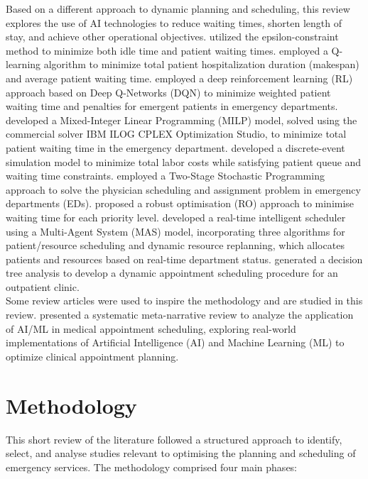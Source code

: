 \documentclass[runningheads]{llncs}
\begin{document}
Based on a different approach to dynamic planning and scheduling, this review explores the use of AI technologies to reduce waiting times, shorten length of stay, and achieve other operational objectives. \cite{fallahpour2024or} utilized the epsilon-constraint method to minimize both idle time and patient waiting times. \cite{bouchlaghem2024surgery} employed a Q-learning algorithm to minimize total patient hospitalization duration (makespan) and average patient waiting time. \cite{lee2020rl} employed a deep reinforcement learning (RL) approach based on Deep Q-Networks (DQN) to minimize weighted patient waiting time and penalties for emergent patients in emergency departments. \cite{harzi2017ed} developed a Mixed-Integer Linear Programming (MILP) model, solved using the commercial solver IBM ILOG CPLEX Optimization Studio, to minimize total patient waiting time in the emergency department. \cite{assad2019ed} developed a discrete-event simulation model to minimize total labor costs while satisfying patient queue and waiting time constraints. \cite{marchesi2020physician} employed a Two-Stage Stochastic Programming approach to solve the physician scheduling and assignment problem in emergency departments (EDs). \cite{mahmoudzadeh2020robust} proposed a robust optimisation (RO) approach to minimise waiting time for each priority level. \cite{munavalli2020mas} developed a real-time intelligent scheduler using a Multi-Agent System (MAS) model, incorporating three algorithms for patient/resource scheduling and dynamic resource replanning, which allocates patients and resources based on real-time department status. \cite{creps2017outpatient} generated a decision tree analysis to develop a dynamic appointment scheduling procedure for an outpatient clinic.\\
Some review articles were used to inspire the methodology and are studied in this review. \cite{knight2023review} presented a systematic meta-narrative review to analyze the application of AI/ML in medical appointment scheduling, exploring real-world implementations of Artificial Intelligence (AI) and Machine Learning (ML) to optimize clinical appointment planning.
\section{Methodology}
This short review of the literature followed a structured approach to identify, select, and analyse studies relevant to optimising the planning and scheduling of emergency services. The methodology comprised four main phases:
\end{document}
